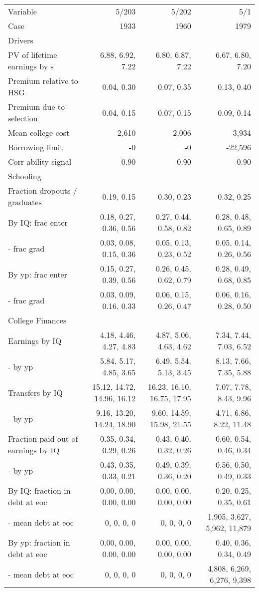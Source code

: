 \begin{tabular}{lrrr}
\hline
Variable & 5/203  & 5/202  & 5/1  \\ 
Case & 1933  & 1960  & 1979  \\ 
Drivers &   &   &   \\ 
PV of lifetime earnings by s & 6.88, 6.92, 7.22  & 6.80, 6.87, 7.22  & 6.67, 6.80, 7.20  \\ 
Premium relative to HSG & 0.04, 0.30  & 0.07, 0.35  & 0.13, 0.40  \\ 
Premium due to selection & 0.04, 0.15  & 0.07, 0.15  & 0.09, 0.14  \\ 
Mean college cost & 2,610  & 2,006  & 3,934  \\ 
Borrowing limit & -0  & -0  & -22,596  \\ 
Corr ability signal & 0.90  & 0.90  & 0.90  \\ 
\hline
Schooling &   &   &   \\ 
Fraction dropouts / graduates & 0.19, 0.15  & 0.30, 0.23  & 0.32, 0.25  \\ 
By IQ: frac enter & 0.18, 0.27, 0.36, 0.56  & 0.27, 0.44, 0.58, 0.82  & 0.28, 0.48, 0.65, 0.89  \\ 
- frac grad & 0.03, 0.08, 0.15, 0.36  & 0.05, 0.13, 0.23, 0.52  & 0.05, 0.14, 0.26, 0.56  \\ 
By yp: frac enter & 0.15, 0.27, 0.39, 0.56  & 0.26, 0.45, 0.62, 0.79  & 0.28, 0.49, 0.68, 0.85  \\ 
- frac grad & 0.03, 0.09, 0.16, 0.33  & 0.06, 0.15, 0.26, 0.47  & 0.06, 0.16, 0.28, 0.50  \\ 
\hline
College Finances &   &   &   \\ 
Earnings by IQ & 4.18, 4.46, 4.27, 4.83  & 4.87, 5.06, 4.63, 4.62  & 7.34, 7.44, 7.03, 6.52  \\ 
- by yp & 5.84, 5.17, 4.85, 3.65  & 6.49, 5.54, 5.13, 3.45  & 8.13, 7.66, 7.35, 5.88  \\ 
Transfers by IQ & 15.12, 14.72, 14.96, 16.12  & 16.23, 16.10, 16.75, 17.95  & 7.07, 7.78, 8.43, 9.96  \\ 
- by yp & 9.16, 13.20, 14.24, 18.90  & 9.60, 14.59, 15.98, 21.55  & 4.71, 6.86, 8.22, 11.48  \\ 
Fraction paid out of earnings by IQ & 0.35, 0.34, 0.29, 0.26  & 0.43, 0.40, 0.32, 0.26  & 0.60, 0.54, 0.46, 0.34  \\ 
- by yp & 0.43, 0.35, 0.33, 0.21  & 0.49, 0.39, 0.36, 0.20  & 0.56, 0.50, 0.49, 0.33  \\ 
By IQ: fraction in debt at eoc & 0.00, 0.00, 0.00, 0.00  & 0.00, 0.00, 0.00, 0.00  & 0.20, 0.25, 0.35, 0.61  \\ 
- mean debt at eoc & 0, 0, 0, 0  & 0, 0, 0, 0  & 1,905, 3,627, 5,962, 11,879  \\ 
By yp: fraction in debt at eoc & 0.00, 0.00, 0.00, 0.00  & 0.00, 0.00, 0.00, 0.00  & 0.40, 0.36, 0.34, 0.49  \\ 
- mean debt at eoc & 0, 0, 0, 0  & 0, 0, 0, 0  & 4,808, 6,269, 6,276, 9,398  \\ 
\hline
\end{tabular}%
